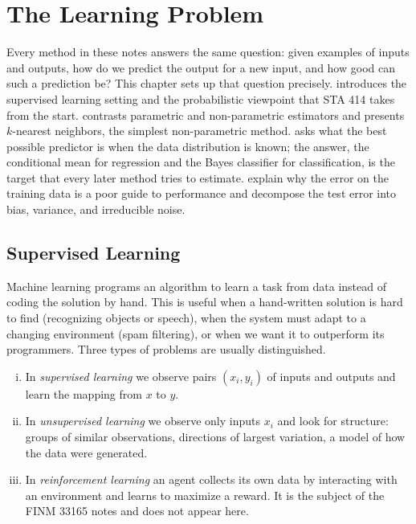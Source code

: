 \chapter{The Learning Problem}\label{ch:learning}

Every method in these notes answers the same question: given examples of inputs and outputs, how do we predict the output for a new input, and how good can such a prediction be? This chapter sets up that question precisely.  introduces the supervised learning setting and the probabilistic viewpoint that STA 414 takes from the start.  contrasts parametric and non-parametric estimators and presents $k$-nearest neighbors, the simplest non-parametric method.  asks what the best possible predictor is when the data distribution is known; the answer, the conditional mean for regression and the Bayes classifier for classification, is the target that every later method tries to estimate.  explain why the error on the training data is a poor guide to performance and decompose the test error into bias, variance, and irreducible noise.

\section{Supervised Learning}\label{sec:supervised}

Machine learning programs an algorithm to learn a task from data instead of coding the solution by hand. This is useful when a hand-written solution is hard to find (recognizing objects or speech), when the system must adapt to a changing environment (spam filtering), or when we want it to outperform its programmers. Three types of problems are usually distinguished.

\begin{enumerate}[(i)]
  \item In \emph{supervised learning} we observe pairs $(x_i,y_i)$ of inputs and outputs and learn the mapping from $x$ to $y$.
  \item In \emph{unsupervised learning} we observe only inputs $x_i$ and look for structure: groups of similar observations, directions of largest variation, a model of how the data were generated.
  \item In \emph{reinforcement learning} an agent collects its own data by interacting with an environment and learns to maximize a reward. It is the subject of the FINM 33165 notes and does not appear here.
\end{enumerate}


